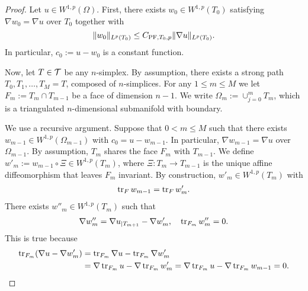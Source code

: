 \documentclass[12pt,a4paper]{article}
\begin{document}
\begin{proof}
    Let $u \in W^{1,p}(\Omega)$. 
    First, there exists $w_0 \in W^{1,p}(T_{0})$ satisfying $\nabla w_0 = \nabla u$ over $T_{0}$ together with 
    \[
        \| w_0 \|_{L^{p}(T_{0})} \leq C_{{\rm{PF}},T_{0},p} \| \nabla u \|_{L^{p}(T_{0})}.
    \]
    In particular, $c_{0} := u - w_0$ is a constant function. 

    Now, let $T \in {\mathcal T}$ be any $n$-simplex. 
    By assumption, there exists a strong path $T_0, T_1, \dots, T_M = T$, composed of $n$-simplices. 
    For any $1 \leq m \leq M$ we let $F_m := T_m \cap T_{m-1}$ be a face of dimension $n-1$. 
    We write $\Omega_m := \cup_{j=0}^{m} T_m$, which is a triangulated $n$-dimensional submanifold with boundary.
    
    We use a recursive argument.
    Suppose that $0 < m \leq M$ such that there exists $w_{m-1} \in W^{1,p}(\Omega_{m-1})$ with $c_{0} = u - w_{m-1}$.
    In particular, $\nabla w_{m-1} = \nabla u$ over $\Omega_{m-1}$. 
    By assumption, $T_{m}$ shares the face $F_{m}$ with $T_{m-1}$. 
    We define $w'_{m} := w_{m-1} \circ \Xi \in W^{1,p}(T_{m})$,
    where $\Xi : T_{m} \rightarrow T_{m-1}$ is the unique affine diffeomorphism that leaves $F_{m}$ invariant. 
    By construction, $w'_{m} \in W^{1,p}(T_{m})$ with 
    \begin{align*}
        \operatorname{tr}_F w_{m-1} = \operatorname{tr}_F w'_{m}
        .
    \end{align*}
    There exists $w''_{m} \in W^{1,p}(T_{m})$ such that 
    \begin{align*}
        \nabla w''_{m} = \nabla u_{|T_{m+1}} - \nabla w'_{m}, 
        \quad 
        \operatorname{tr}_{F_{m}} w''_{m} = 0.
    \end{align*}
    This is true because 
    \begin{align*}
        \operatorname{tr}_{F_{m}}( \nabla u - \nabla w'_{m} ) 
        &= 
        \operatorname{tr}_{F_{m}} \nabla u - \operatorname{tr}_{F_{m}} \nabla w'_{m}
        \\&= 
        \nabla \operatorname{tr}_{F_{m}} u - \nabla \operatorname{tr}_{F_{m}} w'_{m}
        = 
        \nabla \operatorname{tr}_{F_{m}} u - \nabla \operatorname{tr}_{F_{m}} w_{m-1}
        = 
        0
        .
    \end{align*}

\end{proof}
\end{document}
